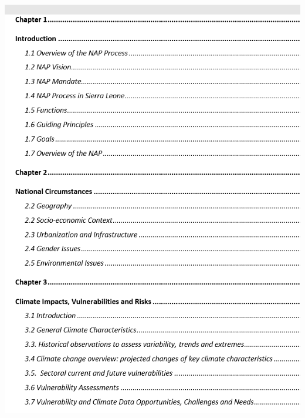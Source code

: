\documentclass[
]{book}
\begin{document}
\begin{enumerate}
  \includegraphics{tutorial_screenshots/SLeone_NAP_chapters.png}
\end{enumerate}
\end{document}
